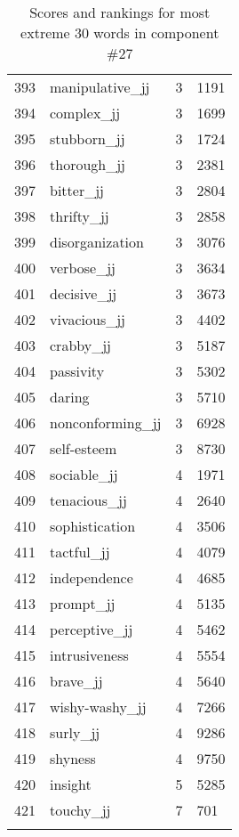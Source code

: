 \begin{longtable}[!htbp]{| rlr@{.}l |}
    393 & manipulative\_jj & 3 & 1191 \\
    394 & complex\_jj & 3 & 1699 \\
    395 & stubborn\_jj & 3 & 1724 \\
    396 & thorough\_jj & 3 & 2381 \\
    397 & bitter\_jj & 3 & 2804 \\
    398 & thrifty\_jj & 3 & 2858 \\
    399 & disorganization & 3 & 3076 \\
    400 & verbose\_jj & 3 & 3634 \\
    401 & decisive\_jj & 3 & 3673 \\
    402 & vivacious\_jj & 3 & 4402 \\
    403 & crabby\_jj & 3 & 5187 \\
    404 & passivity & 3 & 5302 \\
    405 & daring & 3 & 5710 \\
    406 & nonconforming\_jj & 3 & 6928 \\
    407 & self-esteem & 3 & 8730 \\
    408 & sociable\_jj & 4 & 1971 \\
    409 & tenacious\_jj & 4 & 2640 \\
    410 & sophistication & 4 & 3506 \\
    411 & tactful\_jj & 4 & 4079 \\
    412 & independence & 4 & 4685 \\
    413 & prompt\_jj & 4 & 5135 \\
    414 & perceptive\_jj & 4 & 5462 \\
    415 & intrusiveness & 4 & 5554 \\
    416 & brave\_jj & 4 & 5640 \\
    417 & wishy-washy\_jj & 4 & 7266 \\
    418 & surly\_jj & 4 & 9286 \\
    419 & shyness & 4 & 9750 \\
    420 & insight & 5 & 5285 \\
    421 & touchy\_jj & 7 & 701 \\
    \hline
    \caption{Scores and rankings for most extreme 30 words in component \#27} \\
\end{longtable}
